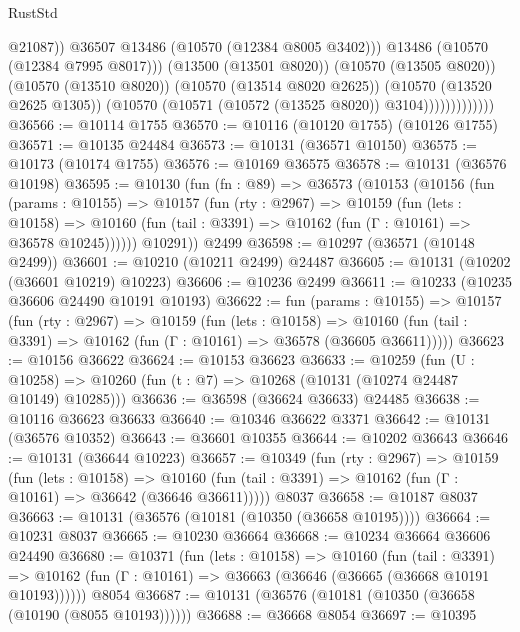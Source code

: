 \begin{lexlean}{RustStd}
\begin{coremodule}
                                  @21087))
                              @36507
                              @13486
                              (@10570 (@12384 @8005 @3402)))
                            @13486
                            (@10570 (@12384 @7995 @8017)))
                          (@13500 (@13501 @8020))
                          (@10570 (@13505 @8020))
                          (@10570 (@13510 @8020))
                          (@10570 (@13514 @8020 @2625))
                          (@10570 (@13520 @2625 @1305))
                          (@10570 (@10571 (@10572 (@13525 @8020)) @3104)))))))))))))
@36566 := @10114 @1755
@36570 := @10116 (@10120 @1755) (@10126 @1755)
@36571 := @10135 @24484
@36573 := @10131 (@36571 @10150)
@36575 := @10173 (@10174 @1755)
@36576 := @10169 @36575
@36578 := @10131 (@36576 @10198)
@36595 := @10130
    (fun (fn : @89) =>
    @36573
      (@10153
        (@10156
          (fun (params : @10155) =>
          @10157
            (fun (rty : @2967) =>
            @10159
              (fun (lets : @10158) =>
              @10160 (fun (tail : @3391) => @10162 (fun (Γ : @10161) => @36578 @10245))))))
        @10291))
    @2499
@36598 := @10297 (@36571 (@10148 @2499))
@36601 := @10210 (@10211 @2499) @24487
@36605 := @10131 (@10202 (@36601 @10219) @10223)
@36606 := @10236 @2499
@36611 := @10233 (@10235 @36606 @24490 @10191 @10193)
@36622 := fun (params : @10155) =>
  @10157
    (fun (rty : @2967) =>
    @10159
      (fun (lets : @10158) =>
      @10160 (fun (tail : @3391) => @10162 (fun (Γ : @10161) => @36578 (@36605 @36611)))))
@36623 := @10156 @36622
@36624 := @10153 @36623
@36633 := @10259
    (fun (U : @10258) => @10260 (fun (t : @7) => @10268 (@10131 (@10274 @24487 @10149) @10285)))
@36636 := @36598 (@36624 @36633) @24485
@36638 := @10116 @36623 @36633
@36640 := @10346 @36622 @3371
@36642 := @10131 (@36576 @10352)
@36643 := @36601 @10355
@36644 := @10202 @36643
@36646 := @10131 (@36644 @10223)
@36657 := @10349
    (fun (rty : @2967) =>
    @10159
      (fun (lets : @10158) =>
      @10160 (fun (tail : @3391) => @10162 (fun (Γ : @10161) => @36642 (@36646 @36611)))))
    @8037
@36658 := @10187 @8037
@36663 := @10131 (@36576 (@10181 (@10350 (@36658 @10195))))
@36664 := @10231 @8037
@36665 := @10230 @36664
@36668 := @10234 @36664 @36606 @24490
@36680 := @10371
    (fun (lets : @10158) =>
    @10160
      (fun (tail : @3391) =>
      @10162 (fun (Γ : @10161) => @36663 (@36646 (@36665 (@36668 @10191 @10193))))))
    @8054
@36687 := @10131 (@36576 (@10181 (@10350 (@36658 (@10190 (@8055 @10193))))))
@36688 := @36668 @8054
@36697 := @10395

\end{coremodule}
\end{lexlean}
